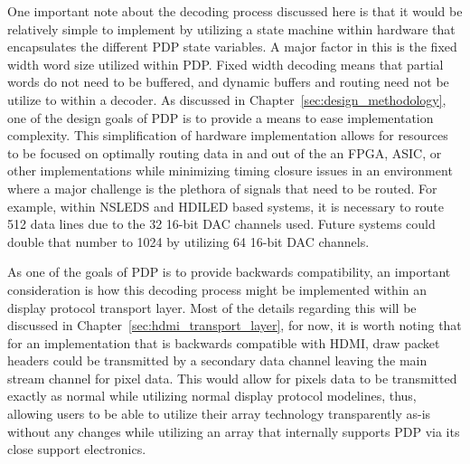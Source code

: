     One important note about the decoding process discussed here is that it would be relatively simple to implement by utilizing a state machine within hardware that encapsulates the different PDP state variables. A major factor in this is the fixed width word size utilized within PDP. Fixed width decoding means that partial words do not need to be buffered, and dynamic buffers and routing need not be utilize to within a decoder. As discussed in Chapter~\ref{sec:design_methodology}, one of the design goals of PDP is to provide a means to ease implementation complexity. This simplification of hardware implementation allows for resources to be focused on optimally routing data in and out of the an FPGA, ASIC, or other implementations while minimizing timing closure issues in an environment where a major challenge is the plethora of signals that need to be routed. For example, within NSLEDS and HDILED based systems, it is necessary to route 512 data lines due to the 32 16-bit DAC channels used. Future systems could double that number to 1024 by utilizing 64 16-bit DAC channels.

    As one of the goals of PDP is to provide backwards compatibility, an important consideration is how this decoding process might be implemented within an display protocol transport layer. Most of the details regarding this will be discussed in Chapter~\ref{sec:hdmi_transport_layer}, for now, it is worth noting that for an implementation that is backwards compatible with HDMI, draw packet headers could be transmitted by a secondary data channel leaving the main stream channel for pixel data. This would allow for pixels data to be transmitted exactly as normal while utilizing normal display protocol modelines, thus, allowing users to be able to utilize their array technology transparently as-is without any changes while utilizing an array that internally supports PDP via its close support electronics.

